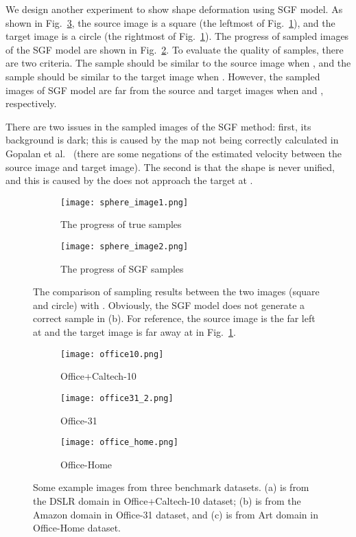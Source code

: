 \documentclass[10pt, conference, compsocconf]{IEEEtran}
\begin{document}
We design another experiment to show shape deformation using SGF model. As shown in  Fig.~\ref{fig:square}, the source image is a square (the leftmost of Fig.~\ref{fig:true}), and the target image is a circle (the rightmost of Fig.~\ref{fig:true}).  The progress of sampled images of the SGF model are shown in Fig.~\ref{fig:SGF}.  To evaluate the quality of samples, there are two criteria. The sample should be similar to the source image when , and the sample should be similar to the target image when .  However, the sampled images of SGF model are far from the source and target images when  and , respectively.

There are two issues in the sampled images of the SGF method: first, its background is dark; this is caused by the  map not being correctly calculated in Gopalan et al.~\cite{gopalan2011domain} (there are some negations of the estimated velocity  between the source image and target image). The second is that the shape is never unified, and this is caused by the  does not approach the target at  \cite{gopalan2011domain}. 


\begin{figure}[h]
\centering
\begin{subfigure}{0.41\textwidth}
\texttt{[image: sphere\_image1.png]}
\caption{The progress of true samples } \label{fig:true}
\end{subfigure}
\begin{subfigure}{0.41\textwidth}
\texttt{[image: sphere\_image2.png]}
\caption{The progress of SGF samples} \label{fig:SGF}
\end{subfigure}
\caption{The comparison of sampling results between the two images (square and circle) with  . Obviously, the SGF model does not generate a correct sample in (b). For reference, the source image is the far left at  and the target image is  far away at  in Fig.~\ref{fig:true}. } \label{fig:square}
\end{figure}


\begin{figure*}[t]
\centering
\begin{subfigure}{0.3\textwidth}
\texttt{[image: office10.png]}
\caption{Office+Caltech-10}
\end{subfigure}
\begin{subfigure}{0.3\textwidth}
\texttt{[image: office31\_2.png]}
\caption{Office-31}
\end{subfigure}
\begin{subfigure}{0.3\textwidth}
\texttt{[image: office\_home.png]}
\caption{Office-Home}
\end{subfigure}
\caption{Some example images from three benchmark datasets. (a) is from the DSLR domain in Office+Caltech-10 dataset; (b) is from the Amazon domain in Office-31 dataset, and (c) is from Art domain in Office-Home dataset.} \label{fig:images}
\end{figure*}
\end{document}

